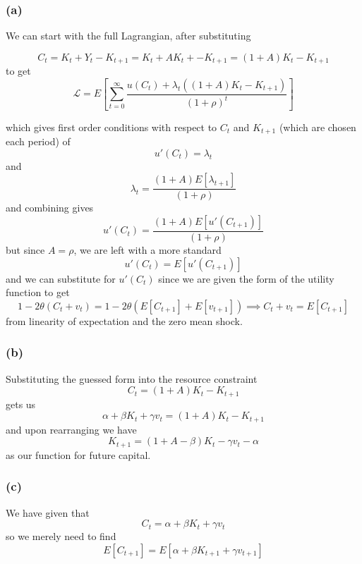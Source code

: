 \documentclass[11pt]{amsart}
\begin{document}
\subsubsection*{(a)}

We can start with the full Lagrangian, after substituting

\[
C_t = K_t + Y_t - K_{t+1} =  K_t + A K_t + - K_{t+1}  = (1 + A) K_t - K_{t+1}
\]
to get
\[
\mathcal{L} = E \left[ \sum_{t=0}^{\infty} \frac{u(C_t) + \lambda_t ((1 + A) K_t - K_{t+1})}{(1+\rho)^t} \right]
\]

which gives first order conditions with respect to $C_t$ and $K_{t+1}$ (which are chosen each period) of
\[
u'(C_t) = \lambda_t
\]
and
\[
\lambda_t = \frac{(1+A) E[\lambda_{t+1}]}{(1+\rho)}
\]
and combining gives
\[
u'(C_t) = \frac{(1+A) E[u'(C_{t+1})]}{(1+\rho)}
\]
but since $A=\rho$, we are left with a more standard
\[
u'(C_t) = E[u'(C_{t+1})]
\]
and we can substitute for $u'(C_t)$ since we are given the form of the utility function to get
\[
1 - 2 \theta (C_t + v_t) = 1 - 2 \theta (E[C_{t+1}] + E[v_{t+1}]) \implies C_t + v_t = E[C_{t+1}]
\]
from linearity of expectation and the zero mean shock.

\subsubsection*{(b)}

Substituting the guessed form into the resource constraint
\[
C_t = (1 + A) K_t - K_{t+1}
\]
gets us
\[
\alpha + \beta K_t + \gamma v_t = (1 + A) K_t - K_{t+1}
\]
and upon rearranging we have
\[
K_{t+1} = (1 + A - \beta) K_t - \gamma v_t - \alpha
\]
as our function for future capital.

\subsubsection*{(c)}

We have given that
\[
C_t = \alpha + \beta K_t + \gamma v_t
\]
so we merely need to find
\[
E[C_{t+1}] = E[\alpha + \beta K_{t+1} + \gamma v_{t+1}]
\]
\end{document}
